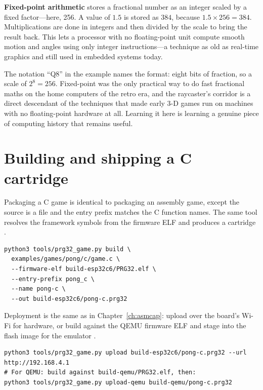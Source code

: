 \begin{prgconcept}
\textbf{Fixed-point arithmetic} stores a fractional number as an integer scaled by
a fixed factor---here, 256. A value of $1.5$ is stored as $384$, because
$1.5\times256=384$. Multiplications are done in integers and then divided by the
scale to bring the result back. This lets a processor with no floating-point unit
compute smooth motion and angles using only integer instructions---a technique as
old as real-time graphics and still used in embedded systems today.
\end{prgconcept}

\begin{prgaside}
The notation ``Q8'' in the example names the format: eight bits of fraction, so a
scale of $2^8 = 256$. Fixed-point was the only practical way to do fast fractional
maths on the home computers of the retro era, and the raycaster's corridor is a
direct descendant of the techniques that made early 3-D games run on machines with
no floating-point hardware at all. Learning it here is learning a genuine piece of
computing history that remains useful.
\end{prgaside}

\section{Building and shipping a C cartridge}

Packaging a C game is identical to packaging an assembly game, except the source
is a  file and the entry prefix matches the C function names. The same
 tool resolves the framework symbols from the firmware ELF
and produces a  cartridge \citep{prg32tutorialc}.

\begin{lstlisting}[style=bash,caption={Building a C cartridge against the board firmware.}]
python3 tools/prg32_game.py build \
  examples/games/pong/c/game.c \
  --firmware-elf build-esp32c6/PRG32.elf \
  --entry-prefix pong_c \
  --name pong-c \
  --out build-esp32c6/pong-c.prg32
\end{lstlisting}

Deployment is the same as in Chapter~\ref{ch:asmcap}: upload over the board's Wi-Fi
for hardware, or build against the QEMU firmware ELF and stage into the flash image
for the emulator \citep{prg32qemu}.

\begin{lstlisting}[style=bash,caption={Uploading the C cartridge to the board, then the QEMU variant.}]
python3 tools/prg32_game.py upload build-esp32c6/pong-c.prg32 --url http://192.168.4.1
# For QEMU: build against build-qemu/PRG32.elf, then:
python3 tools/prg32_game.py upload-qemu build-qemu/pong-c.prg32
\end{lstlisting}

